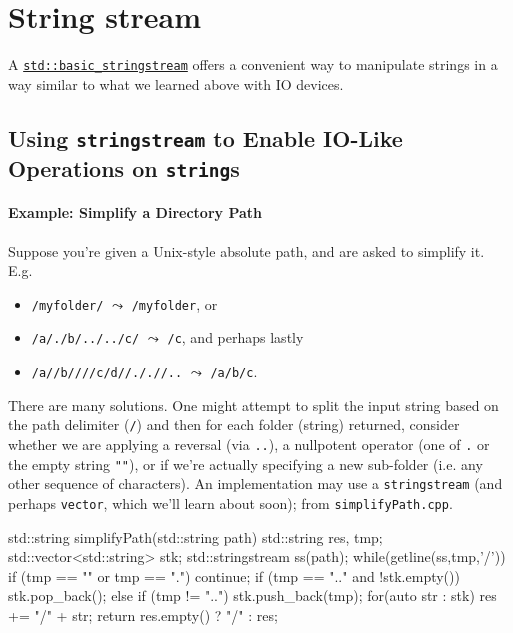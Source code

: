 \documentclass[12pt,letterpaper,twoside]{article}
\begin{document}
\section{String stream}
A \href{https://en.cppreference.com/w/cpp/io/basic_stringstream}
{\texttt{std::basic\_stringstream}} offers a convenient way to manipulate strings in a way similar to what we learned above with IO devices.

\subsection{Using \texttt{stringstream} to Enable IO-Like Operations on \texttt{string}s}
\paragraph{Example: Simplify a Directory Path} Suppose you're given a Unix-style absolute path, and are asked to simplify it. E.g. 
\begin{itemize} 
  \item \texttt{/myfolder/} $\leadsto$ \texttt{/myfolder}, or
  \item \texttt{/a/./b/../../c/} $\leadsto$ \texttt{/c}, and perhaps lastly 
  \item \texttt{/a//b////c/d//././/..} $\leadsto$ \texttt{/a/b/c}.   
\end{itemize}

There are many solutions. One might attempt to split the input string 
based on the path delimiter (\texttt{/}) and then for each 
folder (string) returned, consider whether we are applying a 
reversal (via \texttt{..}), a nullpotent operator (one of \texttt{.} or the empty string  \texttt{""}), or 
if we're actually specifying a new sub-folder (i.e. any other sequence of characters). An implementation may use a \texttt{stringstream} (and perhaps 
\texttt{vector}, which we'll learn about soon); from \texttt{simplifyPath.cpp}.

\begin{cpp}
std::string simplifyPath(std::string path) {
  std::string res, tmp;     
  std::vector<std::string> stk;    
  std::stringstream ss(path);     
  while(getline(ss,tmp,'/')) {         
    if (tmp == "" or tmp == ".")      continue;         
    if (tmp == ".." and !stk.empty()) stk.pop_back();         
    else if (tmp != "..")             stk.push_back(tmp);    
  }     
  for(auto str : stk) res += "/" + str;     
  return res.empty() ? "/" : res; 
}
\end{cpp}
\end{document}

